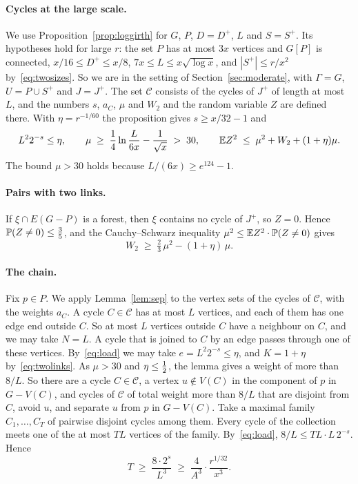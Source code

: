 \paragraph{Cycles at the large scale.}
We use Proposition~\ref{prop:loggirth} for $G$, $P$, $D=D^{+}$, $L$ and $S=S^{+}$. Its hypotheses
hold for large $r$: the set $P$ has at most $3x$ vertices and $G[P]$ is connected,
$x/16\le D^{+}\le x/8$, $7x\le L\le x\sqrt{\log x}$, and $|S^{+}|\le r/x^{2}$
by~\eqref{eq:twosizes}. So we are in the setting of Section~\ref{sec:moderate}, with $\Gamma=G$,
$U=P\cup S^{+}$ and $J=J^{+}$. The set $\mathcal C$ consists of the cycles of $J^{+}$ of length
at most $L$, and the numbers $s$, $a_C$, $\mu$ and $W_2$ and the random variable $Z$ are defined
there. With $\eta=r^{-1/60}$ the proposition gives $s\ge x/32-1$ and
\[
  L^{2}2^{-s}\le\eta,\qquad \mu\;\ge\;\frac14\ln\frac{L}{6x}-\frac1{\sqrt x}\;>\;30,\qquad
  \mathbb{E} Z^{2}\;\le\;\mu^{2}+W_2+(1+\eta)\mu .
\]
The bound $\mu>30$ holds because $L/(6x)\ge e^{124}-1$.

\paragraph{Pairs with two links.}
If $\xi\cap E(G-P)$ is a forest, then $\xi$ contains no cycle of $J^{+}$, so $Z=0$. Hence $\mathbb{P}(Z\ne0)\le\frac35$, and the
Cauchy--Schwarz inequality $\mu^{2}\le\mathbb{E} Z^{2}\cdot\mathbb{P}(Z\ne0)$ gives
\begin{equation}\label{eq:twolinks}
  W_2\;\ge\;\tfrac23\,\mu^{2}-(1+\eta)\,\mu .
\end{equation}

\paragraph{The chain.}
Fix $p\in P$. We apply Lemma~\ref{lem:sep} to the vertex sets of the cycles of $\mathcal C$, with
the weights $a_C$. A cycle $C\in\mathcal C$ has at most $L$ vertices, and each of them has one edge
end outside $C$. So at most $L$ vertices outside $C$ have a neighbour on $C$, and we may take
$N=L$. A cycle that is joined to $C$ by an edge passes through one of these vertices.
By~\eqref{eq:load} we may take $e=L^{2}2^{-s}\le\eta$, and $K=1+\eta$
by~\eqref{eq:twolinks}. As $\mu>30$ and $\eta\le\tfrac12$, the lemma gives a weight of more than
$8/L$. So there are a cycle $C\in\mathcal C$, a vertex $u\notin V(C)$ in the component of $p$ in
$G-V(C)$, and cycles of $\mathcal C$ of total weight more than $8/L$ that are disjoint from $C$,
avoid $u$, and separate $u$ from $p$ in $G-V(C)$. Take a maximal family $C_1,\dots,C_T$ of pairwise
disjoint cycles among them. Every cycle of the collection meets one of the at most $TL$ vertices
of the family. By~\eqref{eq:load}, $8/L\le TL\cdot L\,2^{-s}$. Hence
\[
  T\;\ge\;\frac{8\cdot2^{s}}{L^{3}}\;\ge\;\frac{4}{A^{3}}\cdot\frac{r^{1/32}}{x^{3}}.
\]

